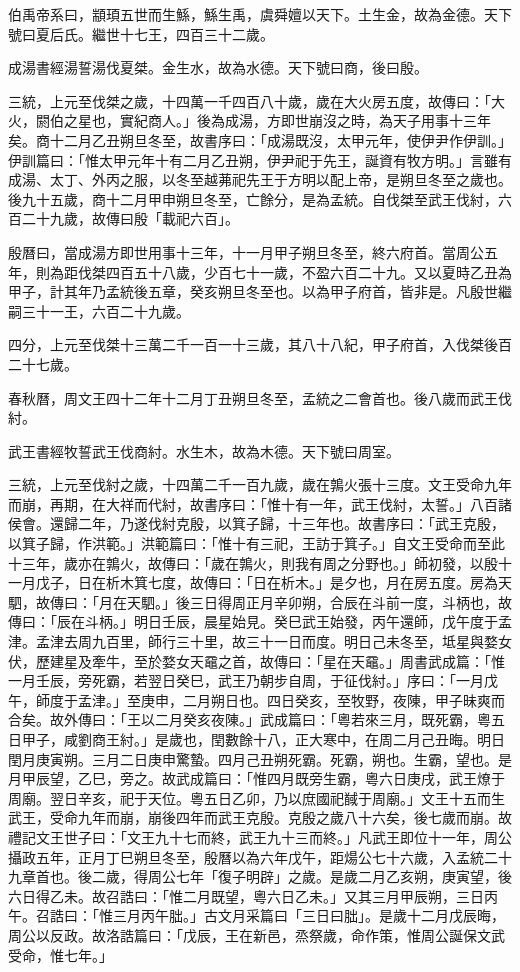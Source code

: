 \begin{pinyinscope}
伯禹帝系曰，顓頊五世而生鯀，鯀生禹，虞舜嬗以天下。土生金，故為金德。天下號曰夏后氏。繼世十七王，四百三十二歲。

成湯書經湯誓湯伐夏桀。金生水，故為水德。天下號曰商，後曰殷。

三統，上元至伐桀之歲，十四萬一千四百八十歲，歲在大火房五度，故傳曰：「大火，閼伯之星也，實紀商人。」後為成湯，方即世崩沒之時，為天子用事十三年矣。商十二月乙丑朔旦冬至，故書序曰：「成湯既沒，太甲元年，使伊尹作伊訓。」伊訓篇曰：「惟太甲元年十有二月乙丑朔，伊尹祀于先王，誕資有牧方明。」言雖有成湯、太丁、外丙之服，以冬至越茀祀先王于方明以配上帝，是朔旦冬至之歲也。後九十五歲，商十二月甲申朔旦冬至，亡餘分，是為孟統。自伐桀至武王伐紂，六百二十九歲，故傳曰殷「載祀六百」。

殷曆曰，當成湯方即世用事十三年，十一月甲子朔旦冬至，終六府首。當周公五年，則為距伐桀四百五十八歲，少百七十一歲，不盈六百二十九。又以夏時乙丑為甲子，計其年乃孟統後五章，癸亥朔旦冬至也。以為甲子府首，皆非是。凡殷世繼嗣三十一王，六百二十九歲。

四分，上元至伐桀十三萬二千一百一十三歲，其八十八紀，甲子府首，入伐桀後百二十七歲。

春秋曆，周文王四十二年十二月丁丑朔旦冬至，孟統之二會首也。後八歲而武王伐紂。

武王書經牧誓武王伐商紂。水生木，故為木德。天下號曰周室。

三統，上元至伐紂之歲，十四萬二千一百九歲，歲在鶉火張十三度。文王受命九年而崩，再期，在大祥而代紂，故書序曰：「惟十有一年，武王伐紂，太誓。」八百諸侯會。還歸二年，乃遂伐紂克殷，以箕子歸，十三年也。故書序曰：「武王克殷，以箕子歸，作洪範。」洪範篇曰：「惟十有三祀，王訪于箕子。」自文王受命而至此十三年，歲亦在鶉火，故傳曰：「歲在鶉火，則我有周之分野也。」師初發，以殷十一月戊子，日在析木箕七度，故傳曰：「日在析木。」是夕也，月在房五度。房為天駟，故傳曰：「月在天駟。」後三日得周正月辛卯朔，合辰在斗前一度，斗柄也，故傳曰：「辰在斗柄。」明日壬辰，晨星始見。癸巳武王始發，丙午還師，戊午度于孟津。孟津去周九百里，師行三十里，故三十一日而度。明日己未冬至，坻星與婺女伏，歷建星及牽牛，至於婺女天黿之首，故傳曰：「星在天黿。」周書武成篇：「惟一月壬辰，旁死霸，若翌日癸巳，武王乃朝步自周，于征伐紂。」序曰：「一月戊午，師度于孟津。」至庚申，二月朔日也。四日癸亥，至牧野，夜陳，甲子昧爽而合矣。故外傳曰：「王以二月癸亥夜陳。」武成篇曰：「粵若來三月，既死霸，粵五日甲子，咸劉商王紂。」是歲也，閏數餘十八，正大寒中，在周二月己丑晦。明日閏月庚寅朔。三月二日庚申驚蟄。四月己丑朔死霸。死霸，朔也。生霸，望也。是月甲辰望，乙巳，旁之。故武成篇曰：「惟四月既旁生霸，粵六日庚戌，武王燎于周廟。翌日辛亥，祀于天位。粵五日乙卯，乃以庶國祀馘于周廟。」文王十五而生武王，受命九年而崩，崩後四年而武王克殷。克殷之歲八十六矣，後七歲而崩。故禮記文王世子曰：「文王九十七而終，武王九十三而終。」凡武王即位十一年，周公攝政五年，正月丁巳朔旦冬至，殷曆以為六年戊午，距煬公七十六歲，入孟統二十九章首也。後二歲，得周公七年「復子明辟」之歲。是歲二月乙亥朔，庚寅望，後六日得乙未。故召誥曰：「惟二月既望，粵六日乙未。」又其三月甲辰朔，三日丙午。召誥曰：「惟三月丙午朏。」古文月采篇曰「三日曰朏」。是歲十二月戊辰晦，周公以反政。故洛誥篇曰：「戊辰，王在新邑，烝祭歲，命作策，惟周公誕保文武受命，惟七年。」


\end{pinyinscope}
